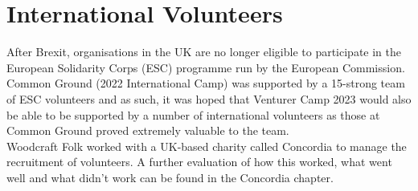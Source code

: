 \section{International Volunteers}
After Brexit, organisations in the UK are no longer eligible to participate in the European Solidarity Corps (ESC) programme run by the European Commission. Common Ground (2022 International Camp) was supported by a 15-strong team of ESC volunteers and as such, it was hoped that Venturer Camp 2023 would also be able to be supported by a number of international volunteers as those at Common Ground proved extremely valuable to the team.\\

Woodcraft Folk worked with a UK-based charity called Concordia to manage the recruitment of volunteers. A further evaluation of how this worked, what went well and what didn't work can be found in the Concordia chapter.
